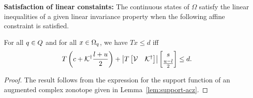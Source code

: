 %
{\bf Satisfaction of linear constaints:}  The continuous states of
$\Omega$ satisfy the linear inequalities of a given linear invariance
property when the following affine constraint is satisfied.
%
\begin{lemma}
For all $q\in Q$ and for all $x\in \Omega_{q}$, we
have $Tx\leq d$ iff
%
\begin{equation}
T\left(c+{\mathcal{K}}^\dagger\frac{l+u}{2}\right)+\left|T\left[\begin{matrix}\mathcal{V}
& {\mathcal{K}}^\dagger\end{matrix}\right]\right|\left[\begin{matrix}s\\\frac{u-l}{2}\end{matrix}\right]\leq d.
\end{equation}
%
\end{lemma}
%
\begin{proof}
The result follows from the expression for the support function of an
augmented complex zonotope given in Lemma~\ref{lem:support-acz}.
\end{proof}
%
